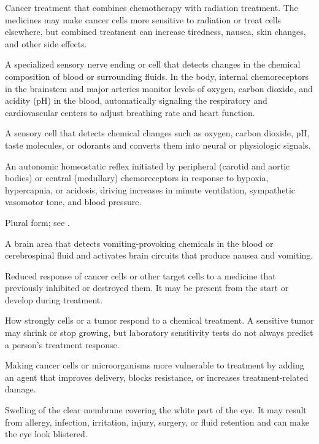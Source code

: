  Cancer treatment that combines chemotherapy with radiation treatment. The medicines may make cancer cells more sensitive to radiation or treat cells elsewhere, but combined treatment can increase tiredness, nausea, skin changes, and other side effects.

 A specialized sensory nerve ending or cell that detects changes in the chemical composition of blood or surrounding fluids. In the body, internal chemoreceptors in the brainstem and major arteries monitor levels of oxygen, carbon dioxide, and acidity (pH) in the blood, automatically signaling the respiratory and cardiovascular centers to adjust breathing rate and heart function.

 A sensory cell that detects chemical changes such as oxygen, carbon dioxide, pH, taste molecules, or odorants and converts them into neural or physiologic signals.

 An autonomic homeostatic reflex initiated by peripheral (carotid and aortic bodies) or central (medullary) chemoreceptors in response to hypoxia, hypercapnia, or acidosis, driving increases in minute ventilation, sympathetic vasomotor tone, and blood pressure.

 Plural form; see .

 A brain area that detects vomiting-provoking chemicals in the blood or cerebrospinal fluid and activates brain circuits that produce nausea and vomiting.

 Reduced response of cancer cells or other target cells to a medicine that previously inhibited or destroyed them. It may be present from the start or develop during treatment.

 How strongly cells or a tumor respond to a chemical treatment. A sensitive tumor may shrink or stop growing, but laboratory sensitivity tests do not always predict a person's treatment response.

 Making cancer cells or microorganisms more vulnerable to treatment by adding an agent that improves delivery, blocks resistance, or increases treatment-related damage.

 Swelling of the clear membrane covering the white part of the eye. It may result from allergy, infection, irritation, injury, surgery, or fluid retention and can make the eye look blistered.

